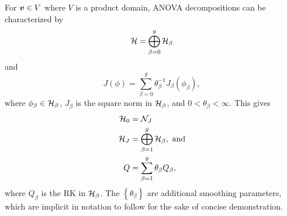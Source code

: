 \bigskip

For $\mbox{\boldmath $v$} \in V$ where $V$ is a product domain, ANOVA decompositions can be characterized by 
\begin{equation}\label{eq:ssanova-decomposition-of-RKHS}
\mathcal{H} = \bigoplus\limits_{\beta=0}^{g} \mathcal{H}_\beta
\end{equation}
\noindent
and
\begin{equation}\label{eq:ssanova-decomposition-of-penalty}
J\left(\phi\right) = \sum_{\beta=0}^{g} \theta^{-1}_\beta J_\beta \left( \phi_\beta \right),
\end{equation}
\noindent
where $\phi_\beta \in \mathcal{H}_\beta$, $J_\beta$ is the square norm in $\mathcal{H}_\beta$, and $0 < \theta_\beta < \infty$. This gives 
\begin{align*}
\mathcal{H}_0 &= \mathcal{N}_J \\
\mathcal{H}_J &= \bigoplus\limits_{\beta=1}^{g} \mathcal{H}_\beta, \mbox{ and} \\
Q &= \sum_{\beta=1}^g \theta_\beta Q_\beta,
\end{align*}
\noindent
where $Q_\beta$ is the RK in $\mathcal{H}_\beta$. The $\left \{ \theta_\beta \right\}$ are additional smoothing parameters, which are implicit in notation to follow for the sake of concise demonstration. 

\bigskip

